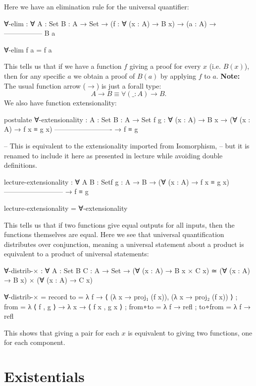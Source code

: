\documentclass{lecturenotes}
\begin{document}
\newpage

Here we have an elimination rule for the universal quantifier:
\begin{code}
∀-elim : ∀ {A : Set} {B : A → Set} →
  (f : ∀ (x : A) → B x) →
      (a : A) →
  -----------------
        B a

∀-elim f a = f a
\end{code}
This tells us that if we have a function $f$ giving a proof for every $x$ (i.e. $B(x)$), then for any specific $a$ we obtain a proof of $B(a)$ by applying $f$ to $a$.
\newline \textbf{Note:} The usual function arrow ($\rightarrow$) is just a forall type:
\[
A \rightarrow B \equiv \forall (\_ : A) \rightarrow B.
\]
We also have function extensionality:
\begin{code}
postulate
  ∀-extensionality : {A : Set} {B : A → Set} {f g : ∀ (x : A) → B x}
    → (∀ (x : A) → f x ≡ g x)
    -------------------------
            → f ≡ g

-- This is equivalent to the extensionality imported from Isomorphism,
-- but it is renamed to include it here as presented in lecture while avoiding double definitions.

lecture-extensionality : ∀ {A B : Set}{f g : A → B}
  → (∀ (x : A) → f x ≡ g x)
  --------------------------
          → f ≡ g

lecture-extensionality = ∀-extensionality
\end{code}
This tells us that if two functions give equal outputs for all inputs, then the functions themselves are equal.
\newline \newline
Here we see that universal quantification distributes over conjunction, 
meaning a universal statement about a product is equivalent to a product of universal statements:
\begin{code}
∀-distrib-× : ∀ {A : Set} {B C : A → Set} →
  (∀ (x : A) → B x × C x) ≃ (∀ (x : A) → B x) × (∀ (x : A) → C x)

∀-distrib-× =
  record
  {
     to      = λ f → ⟨ (λ x → proj₁ (f x)), (λ x → proj₂ (f x)) ⟩
   ; from    = λ { ⟨ f , g ⟩ → λ x → ⟨ f x , g x ⟩ }
   ; from∘to = λ f → refl
   ; to∘from = λ f → refl
   }
\end{code}
This shows that giving a pair for each $x$ is equivalent to giving two functions, one for each component.
\newpage

\section{Existentials}
\label{sec:existentials}
\end{document}
